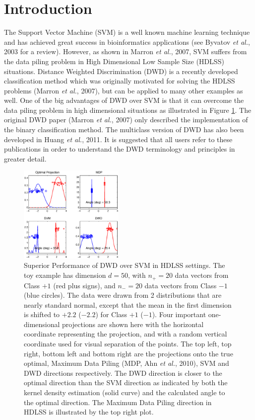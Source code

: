 \documentclass{bioinfo}
\begin{document}
\section{Introduction}

The Support Vector Machine (SVM) is a well known machine learning
technique and has achieved great success in bioinformatics
applications (see Byvatov {\em et al.}, 2003 for a review). However,
as shown in Marron {\em et al.}, 2007, SVM suffers from the data
piling problem in High Dimensional Low Sample Size (HDLSS) situations.
Distance Weighted Discrimination (DWD) is a recently developed
classification method which was originally motivated for solving the
HDLSS problems (Marron {\em et al.}, 2007), but can be applied to many
other examples as well. One of the big advantages of DWD over SVM is
that it can overcome the data piling problem in high dimensional
situations as illustrated in Figure \ref{dwdsvm}. The original DWD
paper (Marron {\em et al.}, 2007) only described the implementation of
the binary classification method. The multiclass version of DWD has
also been developed in Huang {\em et al.}, 2011. It is suggested that
all users refer to these publications in order to understand the DWD
terminology and principles in greater detail.

\begin{figure}[ht]
\begin{center}
\includegraphics[keepaspectratio=true, width=0.45\textwidth]{mdp.ps}
\caption{Superior Performance of DWD over SVM in HDLSS settings. The
  toy example has dimension $d=50$, with $n_+=20$ data vectors from
  Class $+1$ (red plus signs), and $n_-=20$ data vectors from Class
  $-1$ (blue circles). The data were drawn from 2 distributions that
  are nearly standard normal, except that the mean in the first
  dimension is shifted to $+2.2$ ($-2.2$) for Class $+1$ ($-1$). Four
  important one-dimensional projections are shown here with the
  horizontal coordinate representing the projection, and with a random
  vertical coordinate used for visual separation of the points. The
  top left, top right, bottom left and bottom right are the
  projections onto the true optimal, Maximum Data Piling (MDP, Ahn
  {\em et al.}, 2010), SVM and DWD directions respectively. The DWD
  direction is closer to the optimal direction than the SVM direction
  as indicated by both the kernel density estimation (solid curve) and
  the calculated angle to the optimal direction. The Maximum Data
  Piling direction in HDLSS is illustrated by the top right plot.}
\end{center}
\label{dwdsvm}
\end{figure}
\end{document}
